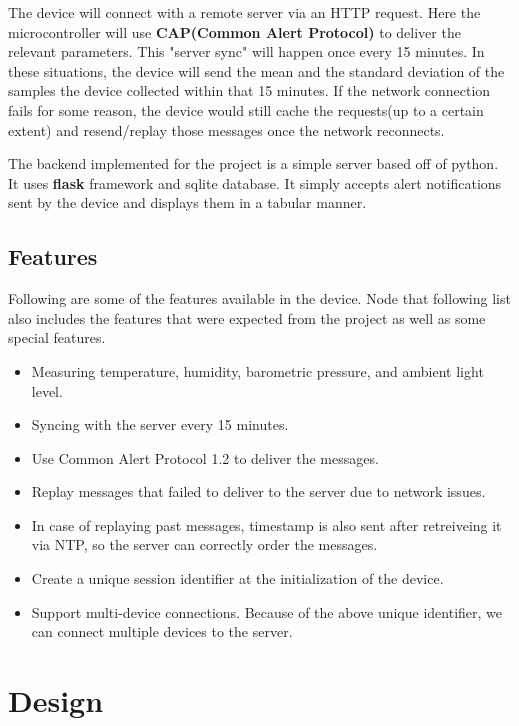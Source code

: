 \documentclass[12pt,a4paper]{article}
\begin{document}
The device will connect with a remote server via
an HTTP request. Here the microcontroller will
use \textbf{CAP(Common Alert Protocol)} to deliver the
relevant parameters. This "server sync" will
happen once every 15 minutes. In these situations,
the device will send the mean and the standard
deviation of the samples the device collected
within that 15 minutes.  If the network connection
fails for some reason, the device would still cache
the requests(up to a certain extent) and resend/replay
those messages once the network reconnects. \par

The backend implemented for the project is a simple
server based off of python. It uses \textbf{flask}
framework and sqlite database. It simply accepts alert
notifications sent by the device and displays them
in a tabular manner. \par


\subsection{Features}

Following are some of the features available in the device.
Node that following list also includes the features that were
expected from the project as well as some special features.
\begin{itemize}[noitemsep]
    \item Measuring temperature, humidity, barometric pressure, and ambient light level.
    \item Syncing with the server every 15 minutes.
    \item Use Common Alert Protocol 1.2 to deliver the messages.
    \item Replay messages that failed to deliver to the server due to network issues.
    \item In case of replaying past messages, timestamp is also sent after retreiveing it via NTP, so the server can correctly order the messages.
    \item Create a unique session identifier at the initialization of the device.
    \item Support multi-device connections. Because of the above unique identifier, we can connect multiple devices to the server.
\end{itemize}

\newpage

\section{Design}
\end{document}
